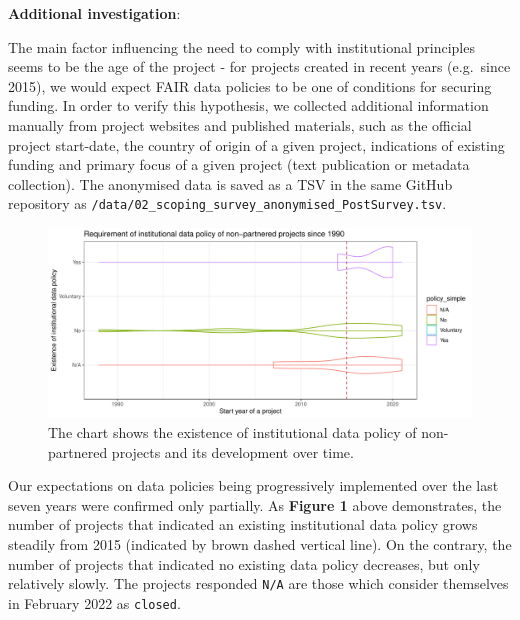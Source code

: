 \documentclass[
  12pt,
]{scrreprt}
\begin{document}
\normalsize

\textbf{Additional investigation}:

The main factor influencing the need to comply with institutional
principles seems to be the age of the project - for projects created in
recent years (e.g.~since 2015), we would expect FAIR data policies to be
one of conditions for securing funding. In order to verify this
hypothesis, we collected additional information manually from project
websites and published materials, such as the official project
start-date, the country of origin of a given project, indications of
existing funding and primary focus of a given project (text publication
or metadata collection). The anonymised data is saved as a TSV in the
same GitHub repository as
\texttt{/data/02\_scoping\_survey\_anonymised\_PostSurvey.tsv}.

\footnotesize

\normalsize

\footnotesize

\begin{figure}

{\centering \includegraphics{01_FAIR_epi_report_files/figure-latex/fig2-1} 

}

\caption{The chart shows the existence of institutional data policy of non-partnered projects and its development over time.}\label{fig:fig2}
\end{figure}

\normalsize

Our expectations on data policies being progressively implemented over
the last seven years were confirmed only partially. As \textbf{Figure 1}
above demonstrates, the number of projects that indicated an existing
institutional data policy grows steadily from 2015 (indicated by brown
dashed vertical line). On the contrary, the number of projects that
indicated no existing data policy decreases, but only relatively slowly.
The projects responded \texttt{N/A} are those which consider themselves
in February 2022 as \texttt{closed}.
\end{document}
